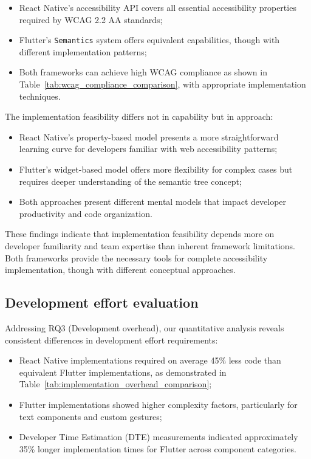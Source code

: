 \begin{itemize}
    \item React Native's accessibility API covers all essential accessibility properties required by WCAG 2.2 AA standards;
    
    \item Flutter's \texttt{Semantics} system offers equivalent capabilities, though with different implementation patterns;
    
    \item Both frameworks can achieve high WCAG compliance as shown in Table~\ref{tab:wcag_compliance_comparison}, with appropriate implementation techniques.
\end{itemize}

The implementation feasibility differs not in capability but in approach:

\begin{itemize}
    \item React Native's property-based model presents a more straightforward learning curve for developers familiar with web accessibility patterns;
    
    \item Flutter's widget-based model offers more flexibility for complex cases but requires deeper understanding of the semantic tree concept;
    
    \item Both approaches present different mental models that impact developer productivity and code organization.
\end{itemize}

These findings indicate that implementation feasibility depends more on developer familiarity and team expertise than inherent framework limitations. Both frameworks provide the necessary tools for complete accessibility implementation, though with different conceptual approaches.

\subsection{Development effort evaluation}
\label{subsec:development-effort}

Addressing RQ3 (Development overhead), our quantitative analysis reveals consistent differences in development effort requirements:

\begin{itemize}
    \item React Native implementations required on average 45\% less code than equivalent Flutter implementations, as demonstrated in Table~\ref{tab:implementation_overhead_comparison};
    
    \item Flutter implementations showed higher complexity factors, particularly for text components and custom gestures;
    
    \item Developer Time Estimation (DTE) measurements indicated approximately 35\% longer implementation times for Flutter across component categories.
\end{itemize}


